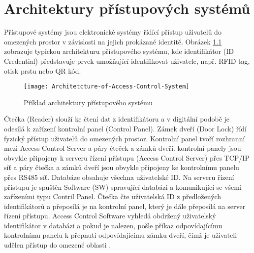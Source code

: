 \chapter{Architektury přístupových systémů}
Přístupové systémy jsou elektronické systémy řídící přístup uživatelů do omezených prostor v závislosti na jejich prokázané identitě.
Obrázek \ref{fig:Access control system architecture} zobrazuje typickou architekturu přístupového systému, kde identifikátor (ID Credential) představuje prvek umožňující identifikovat uživatele, např. RFID tag, otisk prstu nebo QR kód. 

\begin{figure}[!h]
    \centering
    \texttt{[image: Architetcture-of-Access-Control-System]}
    \caption{Příklad architektury přístupového systému \cite{accessControlSystem_eiprocus}}
    \label{fig:Access control system architecture}
\end{figure}

Čtečka (Reader) slouží ke čtení dat z identifikátoru a v digitální podobě je odesílá k zařízení kontrolní panel (Control Panel).
Zámek dveří (Door Lock) řídí fyzický přístup uživatelů do omezených prostor. 
Kontrolní panel tvoří rozhranní mezi Access Control Server a páry čteček a zámků dveří.
kontrolní panely jsou obvykle připojeny k serveru řízení přístupu (Access Control Server) přes TCP/IP síť a páry čtečka a zámků dveří jsou obvykle připojeny ke kontrolnímu panelu přes RS485 síť. Databáze obsahuje všechna uživatelské ID.
Na serveru řízení přístupu je spuštěn Software (SW) spravující databázi a komunikující se všemi zařízeními typu Contril Panel.
Čtečka čte uživatelská ID z předložených identifikátorů a přeposílá je na kontrolní panel, který je dále přeposílá na server řízení přístupu. 
Access Control Software vyhledá obdržený uživatelský identifikátor v databázi a pokud je nalezen, pošle příkaz odpovídajícímu kontrolnímu panelu k přepnutí odpovídajícímu zámku dveří, čímž je uživateli udělen přístup do omezené oblasti \cite{accessControlSystem_eiprocus}.
